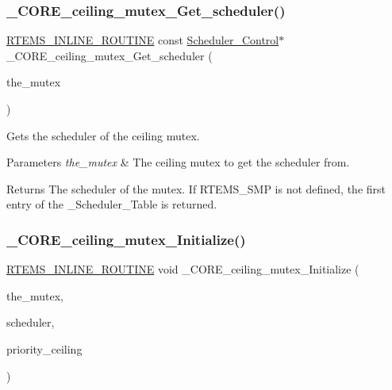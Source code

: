 \subsubsection{\texorpdfstring{\_CORE\_ceiling\_mutex\_Get\_scheduler()}{\_CORE\_ceiling\_mutex\_Get\_scheduler()}}
{\footnotesize\ttfamily \mbox{\hyperlink{group__RTEMSScoreBaseDefs_gac216239df231d5dbd15e3520b0b9313f}{R\+T\+E\+M\+S\+\_\+\+I\+N\+L\+I\+N\+E\+\_\+\+R\+O\+U\+T\+I\+NE}} const \mbox{\hyperlink{struct__Scheduler__Control}{Scheduler\+\_\+\+Control}}$\ast$ \+\_\+\+C\+O\+R\+E\+\_\+ceiling\+\_\+mutex\+\_\+\+Get\+\_\+scheduler (\begin{DoxyParamCaption}\item[{const \mbox{\hyperlink{structCORE__ceiling__mutex__Control}{C\+O\+R\+E\+\_\+ceiling\+\_\+mutex\+\_\+\+Control}} $\ast$}]{the\+\_\+mutex }\end{DoxyParamCaption})}



Gets the scheduler of the ceiling mutex. 


\begin{DoxyParams}{Parameters}
{\em the\+\_\+mutex} & The ceiling mutex to get the scheduler from.\\
\hline
\end{DoxyParams}
\begin{DoxyReturn}{Returns}
The scheduler of the mutex. If R\+T\+E\+M\+S\+\_\+\+S\+MP is not defined, the first entry of the \+\_\+\+Scheduler\+\_\+\+Table is returned. 
\end{DoxyReturn}
\mbox{\label{group__RTEMSScoreMutex_gace1e18f3458f6bd2b21d66efdb26b417}} 
\subsubsection{\texorpdfstring{\_CORE\_ceiling\_mutex\_Initialize()}{\_CORE\_ceiling\_mutex\_Initialize()}}
{\footnotesize\ttfamily \mbox{\hyperlink{group__RTEMSScoreBaseDefs_gac216239df231d5dbd15e3520b0b9313f}{R\+T\+E\+M\+S\+\_\+\+I\+N\+L\+I\+N\+E\+\_\+\+R\+O\+U\+T\+I\+NE}} void \+\_\+\+C\+O\+R\+E\+\_\+ceiling\+\_\+mutex\+\_\+\+Initialize (\begin{DoxyParamCaption}\item[{\mbox{\hyperlink{structCORE__ceiling__mutex__Control}{C\+O\+R\+E\+\_\+ceiling\+\_\+mutex\+\_\+\+Control}} $\ast$}]{the\+\_\+mutex,  }\item[{const \mbox{\hyperlink{struct__Scheduler__Control}{Scheduler\+\_\+\+Control}} $\ast$}]{scheduler,  }\item[{\mbox{\hyperlink{group__RTEMSScorePriority_ga59d02b58072d31a9a1cfe644557aefe2}{Priority\+\_\+\+Control}}}]{priority\+\_\+ceiling }\end{DoxyParamCaption})}



